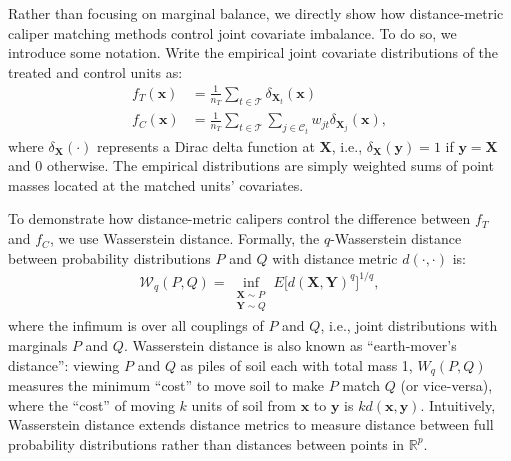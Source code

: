 \documentclass{article}
\newcommand{\bX}{\mathbf{X}}
\newcommand{\Xt}{\mathbf{X}_t}
\newcommand{\Xj}{\mathbf{X}_j}
\newcommand{\Rp}{\mathbb{R}^p}
\newcommand{\Ct}{\mathcal{C}_{t}}
\newcommand{\ind}[1]{\mathds{1} \{ #1 \} }
\begin{document}
Rather than focusing on marginal balance, we directly show how distance-metric caliper matching methods control joint covariate imbalance.
To do so, we introduce some notation.
Write the empirical joint covariate distributions of the treated and control units as:
\begin{align*}
    f_T(\mathbf{x}) 
    &= \frac{1}{n_T} \sum_{t \in \mathcal{T}} \delta_{\Xt}(\mathbf{x}) \\
    f_C(\mathbf{x}) 
    &= \frac{1}{n_T} \sum_{t \in \mathcal{T}} \sum_{j \in \Ct} w_{jt} \delta_{\Xj} (\mathbf{x}),
\end{align*}
where $\delta_{\bX}(\cdot)$ represents a Dirac delta function at $\bX$, i.e., $\delta_{\bX}(\mathbf{y}) = 1$ if $\mathbf{y} = \mathbf{X}$ and $0$ otherwise.
The empirical distributions are simply weighted sums of point masses located at the matched units' covariates.

To demonstrate how distance-metric calipers control the difference between $f_T$ and $f_C$, we use Wasserstein distance.
Formally, the $q$-Wasserstein distance between probability distributions $P$ and $Q$ with distance metric $d(\cdot, \cdot)$ is:
\begin{align*}
    \mathcal{W}_q(P, Q) = \inf_{\substack{\bX \sim P \\ \mathbf{Y} \sim Q}} E\big[ d(\bX, \mathbf{Y})^q \big]^{1/q},
\end{align*}
where the infimum is over all couplings of $P$ and $Q$, i.e., joint distributions with marginals $P$ and $Q$.
Wasserstein distance is also known as ``earth-mover's distance'':
viewing $P$ and $Q$ as piles of soil each with total mass 1, $W_q(P, Q)$ measures the minimum ``cost'' to move soil to make $P$ match $Q$ (or vice-versa), where the ``cost'' of moving $k$ units of soil from $\mathbf{x}$ to $\mathbf{y}$ is $k d(\mathbf{x}, \mathbf{y})$.
Intuitively, Wasserstein distance extends distance metrics to measure distance between full probability distributions rather than distances between points in $\Rp$.
\end{document}
